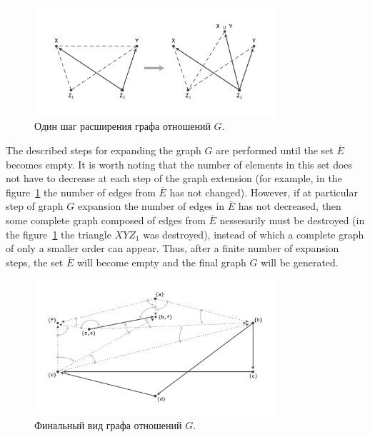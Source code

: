 \documentclass[
11pt,%
tightenlines,%
twoside,%
onecolumn,%
nofloats,%
nobibnotes,%
nofootinbib,%
superscriptaddress,%
noshowpacs,%
centertags]%
{revtex4}
\begin{document}
\begin{figure}[h]
\setcaptionmargin{5mm}
\onelinecaptionsfalse %
\includegraphics[width=0.8\textwidth]{pics/step.pdf}
\caption{Один шаг расширения графа отношений $G$.}
\label{fig:step}
\end{figure}

The described steps for expanding the graph $G$ are performed until the set $\overline{E}$ becomes empty.
It is worth noting that the number of elements in this set does not have to decrease at each step of the graph extension (for example, in the figure~\ref{fig:step} the number of edges from $\overline{E}$ has not changed).
However, if at particular step of graph $G$ expansion the number of edges in $\overline{E}$ has not decreased, then some complete graph composed of edges from $\overline{E}$ nessesarily must be destroyed (in the figure~\ref{fig:step} the triangle $XYZ_1$ was destroyed), instead of which a complete graph of only a smaller order can appear.
Thus, after a finite number of expansion steps, the set $\overline{E}$ will become empty and the final graph $G$ will be generated.

\begin{figure}[h]
\setcaptionmargin{5mm}
\onelinecaptionsfalse %
\includegraphics[width=0.8\textwidth]{pics/g.pdf}
\caption{Финальный вид графа отношений $G$.}
\label{fig:g}
\end{figure}
\end{document}
